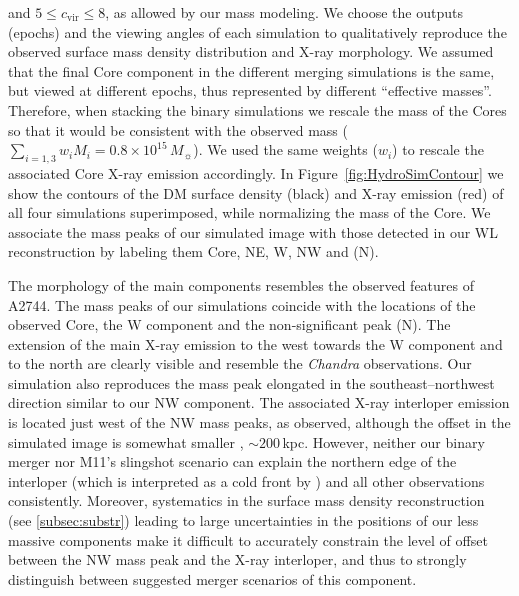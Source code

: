 \documentclass[iop,twocolumn]{emulateapj}
\def\munit{\mbox{$10^{15}\,M_\sun$}}
\begin{document}
and $5\le c_\mathrm{vir}\le8$, as allowed by our mass modeling.
We choose the outputs (epochs) and the viewing angles of each simulation to qualitatively reproduce the observed surface mass density distribution and X-ray morphology. 
We assumed that the final Core component in the different merging simulations is the same, but viewed at different epochs, thus represented by different ``effective masses''.
Therefore, when stacking the binary simulations we rescale the mass of the Cores so that it would be consistent with the observed mass ($\sum_{i=1,3} w_i M_i= 0.8 \times\munit$). We used the same weights ($w_i$) to rescale the associated Core X-ray emission accordingly.
In Figure~\ref{fig:HydroSimContour} we show the contours of the DM surface density (black) and X-ray emission (red) of all four simulations superimposed, while normalizing the mass of the Core.
We associate the mass peaks of our simulated image with those detected in our WL reconstruction by labeling them  Core, NE, W, NW  and (N).

The morphology of the main components resembles the observed features of A2744.
The mass peaks of our simulations coincide with the locations of the 
observed Core, the W component and the non-significant peak (N). 
The extension of the main X-ray emission to the west towards the W component and to the north are clearly visible and resemble the {\it Chandra} observations.
%
Our simulation also reproduces the mass peak elongated in 
the southeast--northwest direction similar to our NW component. 
The associated X-ray interloper emission 
is located just west of the NW mass peaks, as observed, 
although the offset in the simulated image is somewhat smaller , $\sim200$\,kpc.  
However, neither our binary merger nor M11's slingshot scenario can 
explain the northern edge of the interloper (which is interpreted as a 
cold front by \cite{Owers2011}) and all other observations consistently. 
%
Moreover, systematics in the surface mass density reconstruction 
(see \autoref{subsec:substr}) leading to large uncertainties in the positions 
of our less massive components make it difficult to accurately constrain 
the level of offset between the NW mass peak and the X-ray interloper, 
and thus to strongly distinguish between suggested merger scenarios of this component.




\end{document}
